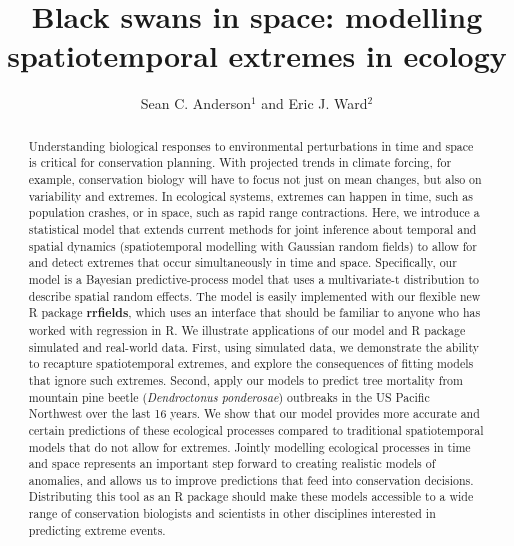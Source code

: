 \documentclass[12pt,english]{article}
\title{Black swans in space: modelling spatiotemporal extremes in ecology}
\author{
Sean C. Anderson$^1$ and
Eric J. Ward$^2$
}
\date{}
\begin{document}
\maketitle

\begin{spacing}{1.5}




\begin{abstract}

Understanding biological responses to environmental perturbations in time and
space is critical for conservation planning. With projected trends in climate
forcing, for example, conservation biology will have to focus not just on mean
changes, but also on variability and extremes. In ecological systems, extremes
can happen in time, such as population crashes, or in space, such as rapid
range contractions. Here, we introduce a statistical model that extends current
methods for joint inference about temporal and spatial dynamics (spatiotemporal
modelling with Gaussian random fields) to allow for and detect extremes that
occur simultaneously in time and space. Specifically, our model is a Bayesian
predictive-process model that uses a multivariate-t distribution to describe
spatial random effects. The model is easily implemented with our flexible new R
package \textbf{rrfields}, which uses an interface that should be familiar to
anyone who has worked with regression in R. We illustrate applications of our
model and R package simulated and real-world data. First, using simulated data,
we demonstrate the ability to recapture spatiotemporal extremes, and explore
the consequences of fitting models that ignore such extremes. Second, apply our
models to predict tree mortality from mountain pine beetle (\emph{Dendroctonus
  ponderosae}) outbreaks in the US Pacific Northwest over the last 16 years. 
We show that our model provides more accurate and certain
predictions of these ecological processes compared to traditional
spatiotemporal models that do not allow for extremes. Jointly modelling
ecological processes in time and space represents an important step forward to
creating realistic models of anomalies, and allows us to improve predictions
that feed into conservation decisions. Distributing this tool as an R package
should make these models accessible to a wide range of conservation biologists
and scientists in other disciplines interested in predicting extreme events.
\end{abstract}


\end{spacing}
\end{document}
